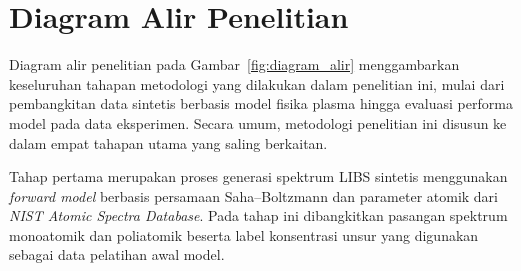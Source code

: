 

\section{Diagram Alir Penelitian}

Diagram alir penelitian pada Gambar~\ref{fig:diagram_alir} menggambarkan keseluruhan tahapan metodologi yang dilakukan dalam penelitian ini, mulai dari pembangkitan data sintetis berbasis model fisika plasma hingga evaluasi performa model pada data eksperimen. Secara umum, metodologi penelitian ini disusun ke dalam empat tahapan utama yang saling berkaitan.

Tahap pertama merupakan proses generasi spektrum LIBS sintetis menggunakan \textit{forward model} berbasis persamaan Saha--Boltzmann dan parameter atomik dari \textit{NIST Atomic Spectra Database}. Pada tahap ini dibangkitkan pasangan spektrum monoatomik dan poliatomik beserta label konsentrasi unsur yang digunakan sebagai data pelatihan awal model.

